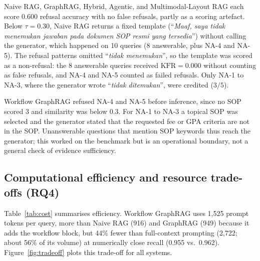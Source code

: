 \documentclass[preprint,10pt]{elsarticle}
\begin{document}
Naive RAG, GraphRAG, Hybrid, Agentic, and Multimodal-Layout RAG each score 0.600 refusal accuracy with no false refusals, partly as a scoring artefact. Below $\tau=0.30$, Naive RAG returns a fixed template (``\textit{Maaf, saya tidak menemukan jawaban pada dokumen SOP resmi yang tersedia}'') without calling the generator, which happened on 10 queries (8 answerable, plus NA-4 and NA-5). The refusal patterns omitted ``\textit{tidak menemukan}'', so the template was scored as a non-refusal: the 8 answerable queries received $\text{KFR}=0.000$ without counting as false refusals, and NA-4 and NA-5 counted as failed refusals. Only NA-1 to NA-3, where the generator wrote ``\textit{tidak ditemukan}'', were credited ($3/5$).

Workflow GraphRAG refused NA-4 and NA-5 before inference, since no SOP scored 3 and similarity was below 0.3. For NA-1 to NA-3 a topical SOP was selected and the generator stated that the requested fee or GPA criteria are not in the SOP. Unanswerable questions that mention SOP keywords thus reach the generator; this worked on the benchmark but is an operational boundary, not a general check of evidence sufficiency.

\subsection{Computational efficiency and resource trade-offs (RQ4)}
Table~\ref{tab:cost} summarises efficiency. Workflow GraphRAG uses 1,525 prompt tokens per query, more than Naive RAG (916) and GraphRAG (949) because it adds the workflow block, but 44\% fewer than full-context prompting (2,722; about 56\% of its volume) at numerically close recall (0.955 vs.\ 0.962). Figure~\ref{fig:tradeoff} plots this trade-off for all systems.
\end{document}
